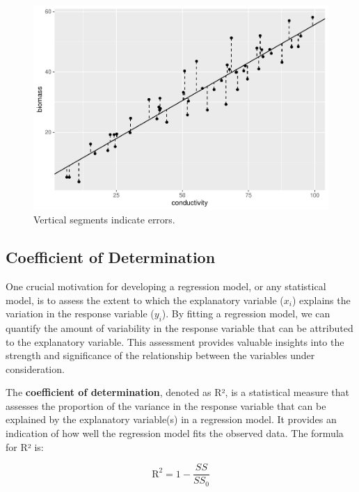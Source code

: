 \documentclass[
]{book}
\begin{document}
\begin{figure}

{\centering \includegraphics{_main_files/figure-latex/geom-errors-1} 

}

\caption{Vertical segments indicate errors.}\label{fig:geom-errors}
\end{figure}

\hypertarget{coefficient-of-determination}{%
\subsection{Coefficient of Determination}\label{coefficient-of-determination}}

One crucial motivation for developing a regression model, or any statistical model, is to assess the extent to which the explanatory variable (\(x_i\)) explains the variation in the response variable (\(y_i\)). By fitting a regression model, we can quantify the amount of variability in the response variable that can be attributed to the explanatory variable. This assessment provides valuable insights into the strength and significance of the relationship between the variables under consideration.

The \textbf{coefficient of determination}, denoted as R², is a statistical measure that assesses the proportion of the variance in the response variable that can be explained by the explanatory variable(s) in a regression model. It provides an indication of how well the regression model fits the observed data. The formula for R² is:

\[
\text{R}^2 = 1 - \frac{SS}{SS_0}
\]
\end{document}
